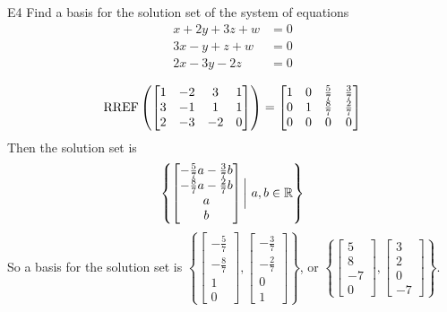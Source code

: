 \documentclass{sbgLAsemi}
\begin{document}
\begin{problem}{E4}
Find a basis for the solution set of the system of equations
\begin{align*}
x+2y+3z+w &= 0 \\
3x-y+z+w &= 0 \\
2x-3y-2z &= 0
\end{align*}
\end{problem}
\begin{solution}
$$\operatorname{RREF} \left(\begin{bmatrix} 1 & -2 & 3 & 1 \\ 3 & -1 & 1 & 1 \\ 2 & -3 & -2 & 0  \end{bmatrix} \right) = \begin{bmatrix} 1 & 0 & \frac{5}{7} & \frac{3}{7} \\ 0 & 1 & \frac{8}{7} & \frac{2}{7} \\ 0 & 0 & 0 & 0\end{bmatrix}$$
Then the solution set is
$$\left\{ \begin{bmatrix} -\frac{5}{7}a-\frac{3}{7}b \\ -\frac{8}{7}a-\frac{2}{7}b \\ a \\ b \end{bmatrix} \bigg |\ a,b \in \mathbb{R} \right\}$$
So a basis for the solution set is $\left\{\begin{bmatrix} -\frac{5}{7} \\ -\frac{8}{7} \\ 1 \\ 0\end{bmatrix}, \begin{bmatrix} - \frac{3}{7} \\ -\frac{2}{7} \\ 0 \\ 1 \end{bmatrix} \right\}$, or $\left\{\begin{bmatrix} 5 \\ 8 \\ -7 \\ 0 \end{bmatrix}, \begin{bmatrix} 3 \\ 2 \\ 0 \\ -7 \end{bmatrix}\right\}$.
\end{solution}
\end{document}
